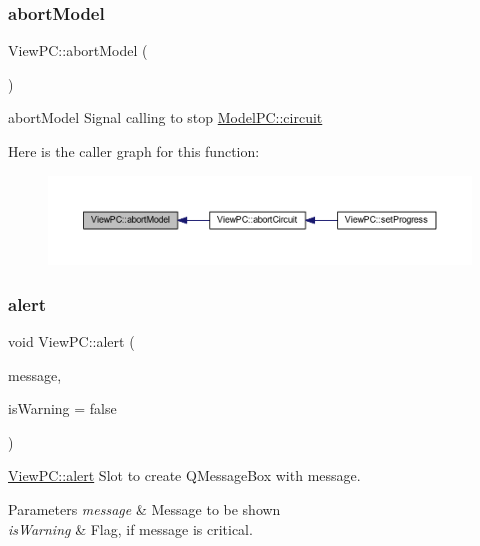 \subsubsection{\texorpdfstring{abort\+Model}{abortModel}}
{\footnotesize\ttfamily View\+P\+C\+::abort\+Model (\begin{DoxyParamCaption}{ }\end{DoxyParamCaption})\hspace{0.3cm}{\ttfamily [signal]}}



abort\+Model Signal calling to stop \mbox{\hyperlink{class_model_p_c_a1d0091062a0c836b283ec2f67411623b}{Model\+P\+C\+::circuit}} 

Here is the caller graph for this function\+:
\nopagebreak
\begin{figure}[H]
\begin{center}
\leavevmode
\includegraphics[width=350pt]{class_view_p_c_a863f5233af3791bd165a2811a5d9bcc2_icgraph}
\end{center}
\end{figure}
\mbox{\label{class_view_p_c_a7c467169467789561078abc9d4fe57bd}} 
\subsubsection{\texorpdfstring{alert}{alert}}
{\footnotesize\ttfamily void View\+P\+C\+::alert (\begin{DoxyParamCaption}\item[{Q\+String}]{message,  }\item[{bool}]{is\+Warning = {\ttfamily false} }\end{DoxyParamCaption})\hspace{0.3cm}{\ttfamily [slot]}}



\mbox{\hyperlink{class_view_p_c_a7c467169467789561078abc9d4fe57bd}{View\+P\+C\+::alert}} Slot to create Q\+Message\+Box with message. 


\begin{DoxyParams}{Parameters}
{\em message} & Message to be shown \\
\hline
{\em is\+Warning} & Flag, if message is critical. \\
\hline
\end{DoxyParams}


